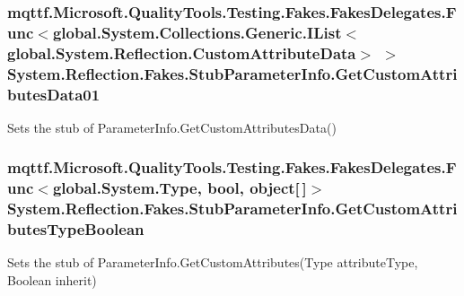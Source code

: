 \hypertarget{class_system_1_1_reflection_1_1_fakes_1_1_stub_parameter_info_ab895b9db92cbaaece20efacf5cc2f28f}{
\subsubsection[{Get\-Custom\-Attributes\-Data01}]{\setlength{\rightskip}{0pt plus 5cm}mqttf.\-Microsoft.\-Quality\-Tools.\-Testing.\-Fakes.\-Fakes\-Delegates.\-Func$<$global.\-System.\-Collections.\-Generic.\-I\-List$<$global.\-System.\-Reflection.\-Custom\-Attribute\-Data$>$ $>$ System.\-Reflection.\-Fakes.\-Stub\-Parameter\-Info.\-Get\-Custom\-Attributes\-Data01}}\label{class_system_1_1_reflection_1_1_fakes_1_1_stub_parameter_info_ab895b9db92cbaaece20efacf5cc2f28f}


Sets the stub of Parameter\-Info.\-Get\-Custom\-Attributes\-Data()

\hypertarget{class_system_1_1_reflection_1_1_fakes_1_1_stub_parameter_info_acbc607ef85e1cf19ed66989be904753f}{
\subsubsection[{Get\-Custom\-Attributes\-Type\-Boolean}]{\setlength{\rightskip}{0pt plus 5cm}mqttf.\-Microsoft.\-Quality\-Tools.\-Testing.\-Fakes.\-Fakes\-Delegates.\-Func$<$global.\-System.\-Type, bool, object\mbox{[}$\,$\mbox{]}$>$ System.\-Reflection.\-Fakes.\-Stub\-Parameter\-Info.\-Get\-Custom\-Attributes\-Type\-Boolean}}\label{class_system_1_1_reflection_1_1_fakes_1_1_stub_parameter_info_acbc607ef85e1cf19ed66989be904753f}


Sets the stub of Parameter\-Info.\-Get\-Custom\-Attributes(\-Type attribute\-Type, Boolean inherit)

